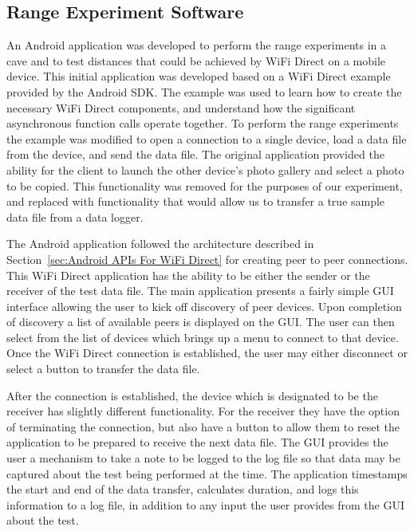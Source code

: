 \documentclass[10pt,twocolumn]{article}
\begin{document}

\subsection{Range Experiment Software}
\label{sec:Range Experiment Software}
An Android application was developed to perform the range experiments in a cave and to test distances that could be achieved by WiFi Direct on a mobile device.
This initial application was developed based on a WiFi Direct example provided by the Android SDK.
The example was used to learn how to create the necessary WiFi Direct components, and understand how the significant asynchronous function calls operate together.
To perform the range experiments the example was modified to open a connection to a single device, load a data file from the device, and send the data file. 
The original application provided the ability for the client to launch the other device's photo gallery and select a photo to be copied.
This functionality was removed for the purposes of our experiment, and replaced with functionality that would allow us to transfer a true sample data file from a data logger.

The Android application followed the architecture described in Section~\ref{sec:Android APIs For WiFi Direct} for creating peer to peer connections. 
This WiFi Direct application has the ability to be either the sender or the receiver of the test data file.
The main application presents a fairly simple GUI interface allowing the user to kick off discovery of peer devices. 
Upon completion of discovery a list of available peers is displayed on the GUI.
The user can then select from the list of devices which brings up a menu to connect to that device.
Once the WiFi Direct connection is established, the user may either disconnect or select a button to transfer the data file.

After the connection is established, the device which is designated to be the receiver has slightly different functionality.
For the receiver they have the option of terminating the connection, but also have a button to allow them to reset the application to be prepared to receive the next data file.
The GUI provides the user a mechanism to take a note to be logged to the log file so that data may be captured about the test being performed at the time.
The application timestamps the start and end of the data transfer, calculates duration, and logs this information to a log file, in addition to any input the user provides from the GUI about the test.
\end{document}
